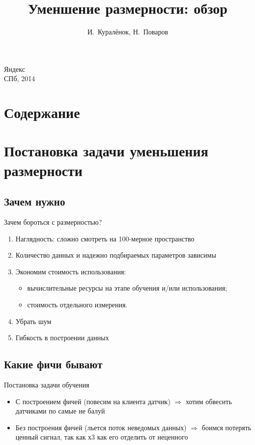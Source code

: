 \documentclass[14pt, fleqn, xcolor={dvipsnames, table}]{beamer}
\title{Уменшение размерности: обзор\\\small{}}
\author[]{\small{%
И.~Куралёнок,
Н.~Поваров}}
\date{}
\begin{document}
\begin{frame}
\maketitle
\small
\begin{center}
\vspace{-60pt}
\normalsize {\color{red}Я}ндекс \\
\vspace{80pt}
\footnotesize СПб, 2014
\end{center}
\end{frame}

\section{Содержание}
\section{Постановка задачи уменьшения размерности}
\subsection{Зачем нужно}
\begin{frame}{Зачем бороться с размерностью?}
\begin{enumerate}
  \item Наглядность: сложно смотреть на 100-мерное пространство
  \item Количество данных и надежно подбираемых параметров зависимы
  \item Экономим стоимость использования:
  \begin{itemize}
    \item вычислительные ресурсы на этапе обучения и/или использования;
    \item стоимость отдельного измерения.
  \end{itemize}
  \item Убрать шум
  \item Гибкость в построении данных
\end{enumerate}
\end{frame}

\subsection{Какие фичи бывают}
\begin{frame}{Постановка задачи обучения}
\begin{itemize}
  \item С построением фичей (повесим на клиента датчик) $\Rightarrow$ хотим обвесить датчиками по самые не балуй
  \item Без построения фичей (льется поток неведомых данных) $\Rightarrow$ боимся потерять ценный сигнал, так как х3 как его отделить от неценного
\end{itemize}
\end{frame}
\end{document}
